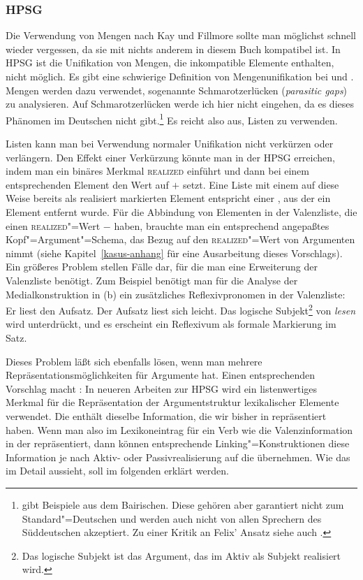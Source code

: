 \subsubsection{HPSG}
\label{sec-vererbung-koenig}

Die Verwendung von Mengen nach Kay und Fillmore sollte man möglichst schnell wieder vergessen,
da sie mit nichts anderem in diesem Buch kompatibel ist. In HPSG ist die Unifikation von Mengen,
die inkompatible Elemente enthalten, nicht möglich. Es gibt eine schwierige Definition von Mengenunifikation
bei \citet[--49]{ps} und \citet{PM90a}. Mengen werden dazu verwendet, sogenannte Schmarotzerlücken (\emph{parasitic gaps})
zu analysieren. Auf Schmarotzerlücken werde ich hier nicht eingehen, da es dieses Phänomen im Deutschen
nicht gibt.\footnote{
        \citet*{Felix85} gibt Beispiele aus dem  Bairischen. 
        Diese gehören aber garantiert nicht zum Standard"=Deutschen und
        werden auch nicht von allen Sprechern des Süddeutschen akzeptiert. 
        Zu einer Kritik an Felix' Ansatz siehe auch 
        \citet*[]{Oppenrieder91a}.
}
Es reicht also aus, Listen zu verwenden.

Listen kann man bei Verwendung normaler Unifikation nicht verkürzen oder verlängern. Den Effekt
einer Verkürzung könnte man in der HPSG erreichen, indem man ein binäres Merkmal \textsc{realized}
einführt und dann bei einem entsprechenden Element den Wert auf $+$ setzt. 
Eine Liste mit einem auf diese Weise bereits als realisiert markierten Element entspricht
einer \subcatl, aus der ein Element entfernt wurde. Für die Abbindung von Elementen
in der Valenzliste, die einen \textsc{realized}"=Wert $-$ haben, brauchte man ein entsprechend
angepaßtes Kopf"=Argument"=Schema, das Bezug auf den \textsc{realized}"=Wert von Argumenten nimmt
(siehe Kapitel~\ref{kasus-anhang} für eine Ausarbeitung dieses Vorschlags).
Ein größeres Problem stellen Fälle dar, für die man eine Erweiterung der Valenzliste
benötigt. Zum Beispiel benötigt man für die Analyse der Medialkonstruktion in (b)
ein zusätzliches Reflexivpronomen in der Valenzliste:
\eal
\ex Er          liest den Aufsatz.
\ex Der Aufsatz liest sich leicht.
\zl
Das logische Subjekt\footnote{
  Das logische Subjekt ist das Argument, das im Aktiv als Subjekt realisiert wird.%
}
von \emph{lesen} wird unterdrückt, und es erscheint ein Reflexivum als
formale Markierung im Satz.

%
Dieses Problem läßt sich ebenfalls lösen, wenn man mehrere Repräsentationsmöglichkeiten für
Argumente hat. Einen entsprechenden Vorschlag macht \citet{Koenig99a}: In neueren Arbeiten
zur HPSG wird ein listenwertiges Merkmal \argst{} für die Repräsentation der Argumentstruktur
lexikalischer Elemente verwendet. Die \argstl enthält dieselbe Information, die wir
bisher in \subcat repräsentiert haben. Wenn man also im Lexikoneintrag für ein Verb
wie  die Valenzinformation in der \argstl repräsentiert, dann können entsprechende
Linking"=Konstruktionen diese Information je nach Aktiv- oder Passivrealisierung auf
die \subcatl übernehmen. Wie das im Detail aussieht, soll im folgenden erklärt werden.

